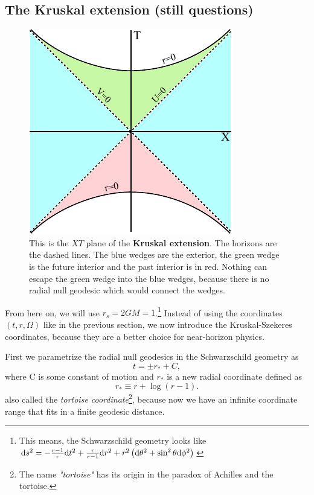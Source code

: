 \subsection{The Kruskal extension \checkmark (still questions)}
		\begin{figure}[htbp]
			\begin{center}
				\includegraphics[scale=1]{kruskal}
			\end{center}
			\caption{This is the $XT$ plane of the \textbf{Kruskal extension}. The horizons are the dashed lines. The {\color{blue} blue} wedges are the exterior, the {\color{forestgreen} green} wedge is the future interior and the past interior is in {\color{red} red}. Nothing can escape the {\color{forestgreen} green} wedge into the {\color{blue} blue} wedges, because there is no radial null geodesic which would connect the wedges.}\label{kruskal}	
		\end{figure}
	From here on, we will use $r_{s}=2GM=1$.\footnote{This means, the Schwarzschild geometry looks like $\mathrm{d} s^2=-\frac{r-1}{r} \mathrm{d} t^2+\frac{r}{r-1}
		\mathrm{d} r^2+r^2 \left( \mathrm{d} \theta^2+\sin^2\theta \mathrm{d} \phi^2 \right)$}
	Instead of using the coordinates $(t,r,\Omega)$ like in the previous section, we now introduce the Kruskal-Szekeres coordinates, because they are a better choice for near-horizon physics.
	
	First we parametrize the radial null geodesics in the Schwarzschild geometry as
		\begin{equation}
			t=\pm r_{*} + C,
		\end{equation}
	where C is some constant of motion and $r_{*}$ is a new radial coordinate defined as
		\begin{equation} \label{r_*tortoise}
			r_{*}\equiv r+\log (r-1).
		\end{equation}
	also called the \textit{tortoise coordinate}\footnote{The name \textit{"tortoise"} has its origin in the paradox of Achilles and the tortoise.}, because now we have an infinite coordinate range that fits in a finite geodesic distance.
		
